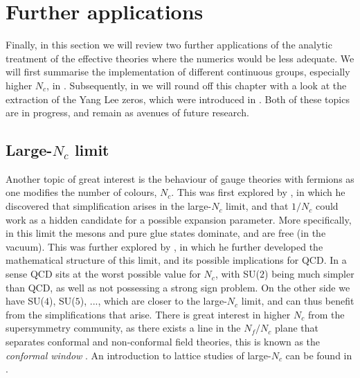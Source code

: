 \section{Further applications}

Finally, in this section we will review two further applications of the analytic
treatment of the effective theories where the numerics would be less adequate.
We will first summarise the implementation of different continuous groups,
especially higher $N_c$, in . Subsequently, in
 we will round off this chapter with a look at the
extraction of the Yang Lee zeros, which were introduced in
. Both of these topics are in progress, and
remain as avenues of future research.

\subsection{Large-\texorpdfstring{$N_c$}{Nc} limit} \label{sec:large_nc_study}

Another topic of great interest is the behaviour of gauge theories with
fermions as one modifies the number of colours, $N_c$. This was first explored
by \cite{'tHooft:1973jz}, in which he discovered that simplification arises in
the large-$N_c$ limit, and that $1/N_c$ could work as a hidden candidate for a
possible expansion parameter. More specifically, in this limit the mesons and
pure glue states dominate, and are free (in the vacuum). This was further
explored by \cite{Witten:1979kh}, in which he further developed the mathematical
structure of this limit, and its possible implications for QCD. In a sense QCD
sits at the worst possible value for $N_c$, with SU($2$) being much simpler than
QCD, as well as not possessing a strong sign problem. On the other side we have
SU($4$), SU($5$), ..., which are closer to the large-$N_c$ limit, and can thus
benefit from the simplifications that arise. There is great interest in higher
$N_c$ from the supersymmetry community, as there exists a line in the $N_f \big/
N_c$ plane that separates conformal and non-conformal field theories, this is
known as the \emph{conformal window} \citep{Dietrich:2006cm}. An introduction to
lattice studies of large-$N_c$ can be found in \citep{Lucini:2013qja}.

